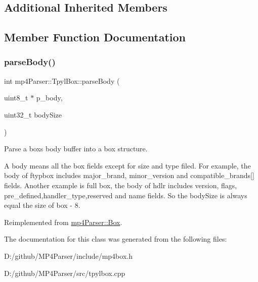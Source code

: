 \subsection*{Additional Inherited Members}


\subsection{Member Function Documentation}
\mbox{\label{classmp4_parser_1_1_tpyl_box_a957b9654a98d8bbaf39a41efc273d642}} 
\subsubsection{\texorpdfstring{parseBody()}{parseBody()}}
{\footnotesize\ttfamily int mp4\+Parser\+::\+Tpyl\+Box\+::parse\+Body (\begin{DoxyParamCaption}\item[{uint8\+\_\+t $\ast$}]{p\+\_\+body,  }\item[{uint32\+\_\+t}]{body\+Size }\end{DoxyParamCaption})\hspace{0.3cm}{\ttfamily [virtual]}}



Parse a box\textquotesingle{}s body buffer into a box structure. 

A body means all the box fields except for size and type filed. For example, the body of ftypbox includes major\+\_\+brand, minor\+\_\+version and compatible\+\_\+brands\mbox{[}\mbox{]} fields. Another example is full box, the body of hdlr includes version, flags, pre\+\_\+defined,handler\+\_\+type,reserved and name fields. So the body\+Size is always equal the size of box -\/ 8. 

Reimplemented from \mbox{\hyperlink{classmp4_parser_1_1_box_a3dd0c084ac65bc77b69ac5ecaf796cb2}{mp4\+Parser\+::\+Box}}.



The documentation for this class was generated from the following files\+:\begin{DoxyCompactItemize}
\item 
D\+:/github/\+M\+P4\+Parser/include/mp4box.\+h\item 
D\+:/github/\+M\+P4\+Parser/src/tpylbox.\+cpp\end{DoxyCompactItemize}
